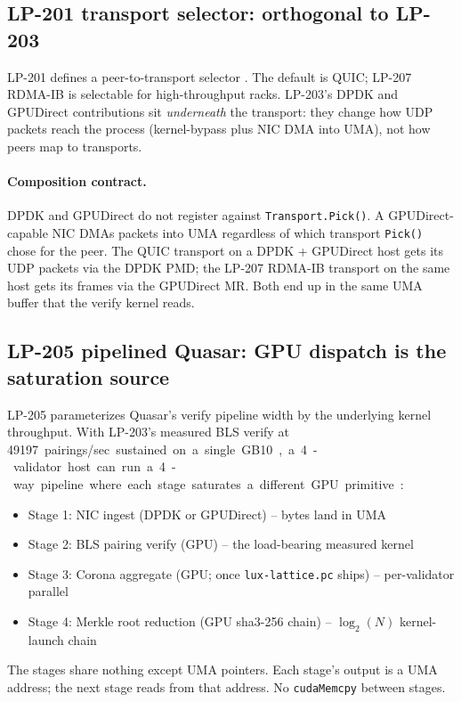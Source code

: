 \subsection{LP-201 transport selector: orthogonal to LP-203}

LP-201 defines a peer-to-transport selector \cite{lp201}. The
default is QUIC; LP-207 RDMA-IB is selectable for high-throughput
racks. LP-203's DPDK and GPUDirect contributions sit
\emph{underneath} the transport: they change how UDP packets
reach the process (kernel-bypass plus NIC DMA into UMA), not how
peers map to transports.

\paragraph{Composition contract.} DPDK and GPUDirect do not
register against \texttt{Transport.Pick()}. A GPUDirect-capable
NIC DMAs packets into UMA regardless of which transport
\texttt{Pick()} chose for the peer. The QUIC transport on a
DPDK + GPUDirect host gets its UDP packets via the
DPDK PMD; the LP-207 RDMA-IB transport on the same host gets
its frames via the GPUDirect MR. Both end up in the same UMA
buffer that the verify kernel reads.

\subsection{LP-205 pipelined Quasar: GPU dispatch is the
saturation source}

LP-205 \cite{lp205} parameterizes Quasar's verify pipeline
width by the underlying kernel throughput. With LP-203's
measured BLS verify at \SI{49197}~pairings/sec sustained on
a single GB10, a 4-validator host can run a 4-way pipeline
where each stage saturates a different GPU primitive:

\begin{itemize}[leftmargin=2em,nosep]
\item Stage 1: NIC ingest (DPDK or GPUDirect) -- bytes land
  in UMA
\item Stage 2: BLS pairing verify (GPU) -- the load-bearing
  measured kernel
\item Stage 3: Corona aggregate (GPU; once
  \texttt{lux-lattice.pc} ships) -- per-validator parallel
\item Stage 4: Merkle root reduction (GPU sha3-256 chain)
  -- $\log_2(N)$ kernel-launch chain
\end{itemize}

The stages share nothing except UMA pointers. Each stage's
output is a UMA address; the next stage reads from that
address. No \texttt{cudaMemcpy} between stages.


